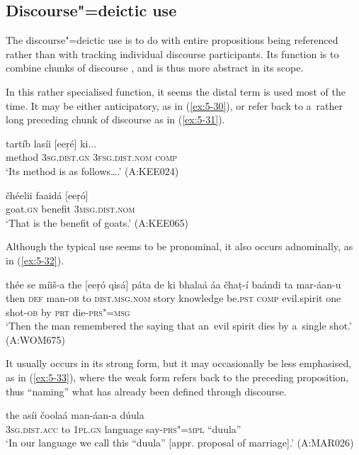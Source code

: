 \subsection{Discourse"=deictic use}
\label{subsec:5-2-5}

The discourse"=deictic use is to do with entire propositions being referenced rather than with tracking individual discourse participants. Its function is to combine chunks of discourse \citep[432]{diessel2006}, and is thus more abstract in its scope.



In this rather specialised function, it seems the distal term is used most of the time. It may be either anticipatory, as in (\ref{ex:5-30}), or refer back to a~rather long preceding chunk of discourse as in (\ref{ex:5-31}).

\begin{exe}
\ex
\label{ex:5-30}
\gll tartíb lasíi [eeṛé] ki...\\
method \textsc{3sg}.\textsc{dist.gn} \textsc{3fsg}.\textsc{dist.nom} \textsc{comp}\\
\glt `Its method is as follows{\ldots}.' (A:KEE024)

\ex
\label{ex:5-31}
\gll čhéelii faaidá [eeṛó]\\
goat.\textsc{gn} benefit \textsc{3msg}.\textsc{dist.nom}\\
\glt `That is the benefit of goats.' (A:KEE065)
\end{exe}
Although the typical use seems to be pronominal, it also occurs adnominally, as in (\ref{ex:5-32}).
\begin{exe}
\ex
\label{ex:5-32}
\gll thée se míiš-a the [eeṛó qisá] páta de ki bhalaá áa čhaṭ-í baándi ta mar-áan-u\\
then \textsc{def} man-\textsc{ob} to \textsc{dist.msg.nom} story knowledge be.\textsc{pst} \textsc{comp} evil.spirit one shot-\textsc{ob} by \textsc{prt} die-\textsc{prs"=msg}\\
\glt `Then the man remembered the saying that an~evil spirit dies by a~single shot.' (A:WOM675)
\end{exe}
It usually occurs in its strong form, but it may occasionally be less emphasised, as in (\ref{ex:5-33}), where the weak form refers back to the preceding proposition, thus ``naming'' what has already been defined through discourse.
\begin{exe}
\ex
\label{ex:5-33}
\gll [ṛas] the asíi čoolaá man-áan-a dúula\\
\textsc{3sg}.\textsc{dist.acc} to \textsc{1pl.gn} language say-\textsc{prs"=mpl} ``duula''\\
\glt `In our language we call this ``duula'' [appr. proposal of marriage].' (A:MAR026)
\end{exe}
